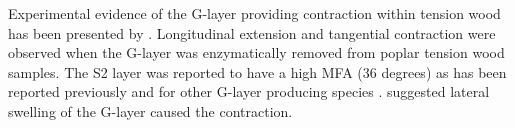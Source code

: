 Experimental evidence of the G-layer providing contraction within tension wood
has been presented by \cite{Goswami_2008}. Longitudinal extension and tangential
contraction were observed when the G-layer was enzymatically removed from
poplar tension wood samples. The S2 layer was reported to have a high MFA (36
degrees) as has been reported previously and for other G-layer producing species
\cite{M_ller_2006}. \cite{Goswami_2008} suggested lateral swelling of the G-layer caused the
contraction.
